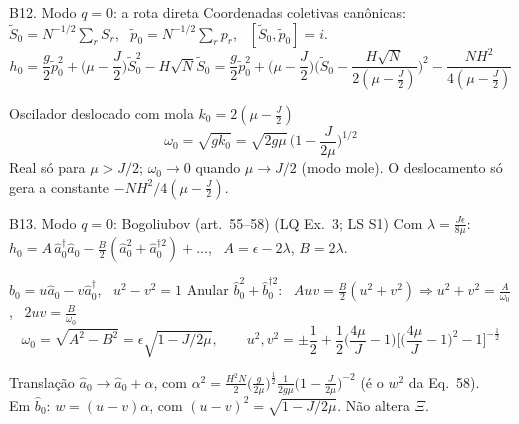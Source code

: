 \documentclass[10pt,aspectratio=169]{beamer}
\newcommand{\lista}[1]{\textcolor{qcdGreen!70!black}{\small(#1)}}
\newcommand{\eq}[1]{\textcolor{qcdBlue!70!black}{\small(#1)}}
\begin{document}
\begin{frame}{B12. Modo $q=0$: a rota direta}
  \small
  Coordenadas coletivas canônicas: $\tilde S_0=N^{-1/2}\sum_rS_r$, \ $\tilde p_0=N^{-1/2}\sum_rp_r$, \ $[\tilde S_0,\tilde p_0]=i$.
  \[h_0=\frac g2\tilde p_0^2+\Big(\mu-\frac J2\Big)\tilde S_0^2-H\sqrt N\tilde S_0
    =\frac g2\tilde p_0^2+\Big(\mu-\frac J2\Big)\Big(\tilde S_0-\frac{H\sqrt N}{2(\mu-\frac J2)}\Big)^2-\frac{NH^2}{4(\mu-\frac J2)}\]
  \begin{exampleblock}{Oscilador deslocado com mola $k_0=2(\mu-\frac J2)$}
    \[\omega_0=\sqrt{gk_0}=\sqrt{2g\mu}\,\Big(1-\frac J{2\mu}\Big)^{1/2}\]
    Real só para $\mu>J/2$; $\omega_0\to0$ quando $\mu\to J/2$ (modo mole).
    O deslocamento só gera a constante $-NH^2/4(\mu-\frac J2)$.
  \end{exampleblock}
\end{frame}

\begin{frame}{B13. Modo $q=0$: Bogoliubov \eq{art.~55--58} \lista{LQ Ex.~3; LS S1}}
  \footnotesize
  Com $\lambda=\frac{J\epsilon}{8\mu}$: \ $h_0=A\,\hat a_0^\dagger\hat a_0-\frac B2(\hat a_0^2+\hat a_0^{\dagger2})+\dots$, \ $A=\epsilon-2\lambda$, $B=2\lambda$.
  \begin{block}{$\hat b_0=u\hat a_0-v\hat a_0^\dagger$, \ $u^2-v^2=1$}
    Anular $\hat b_0^2+\hat b_0^{\dagger2}$: \ $Auv=\frac B2(u^2+v^2)\Rightarrow u^2+v^2=\frac A{\omega_0}$, \ $2uv=\frac B{\omega_0}$
    \[\omega_0=\sqrt{A^2-B^2}=\epsilon\sqrt{1-J/2\mu},\qquad
      u^2,v^2=\pm\frac12+\frac12\Big(\frac{4\mu}J-1\Big)\Big[\Big(\frac{4\mu}J-1\Big)^2-1\Big]^{-\frac12}\]
  \end{block}
  \begin{block}{Translação}
    $\hat a_0\to\hat a_0+\alpha$, com
    $\alpha^2=\frac{H^2N}2\big(\frac g{2\mu}\big)^{\frac12}\frac1{2g\mu}\big(1-\frac J{2\mu}\big)^{-2}$ (é o $w^2$ da Eq.~58).\\
    Em $\hat b_0$: $w=(u-v)\alpha$, com $(u-v)^2=\sqrt{1-J/2\mu}$. Não altera $\Xi$.
  \end{block}
\end{frame}
\end{document}
